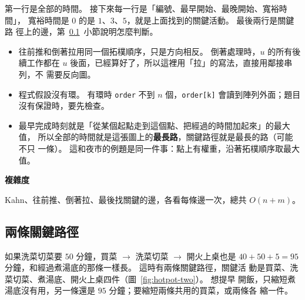 
第一行是全部的時間。 接下來每一行是「編號、最早開始、最晚開始、寬裕時間」，
寬裕時間是 $0$ 的是 $1$、$3$、$5$，就是上面找到的關鍵活動。 最後兩行是關鍵路
徑上的邊，第~\ref{sec:cp-all}~小節說明怎麼判斷。

\begin{itemize}
\item 往前推和倒著拉用同一個拓樸順序，只是方向相反。 倒著處理時，$u$ 的所有後
續工作都在 $u$ 後面，已經算好了，所以這裡用「拉」的寫法，直接用鄰接串列，不
需要反向圖。
\item 程式假設沒有環。 有環時 \texttt{order} 不到 $n$ 個，\texttt{order[k]}
會讀到陣列外面；題目沒有保證時，要先檢查。
\item 最早完成時刻就是「從某個起點走到這個點、把經過的時間加起來」的最大值，
所以全部的時間就是這張圖上的\textbf{最長路}，關鍵路徑就是最長的路（可能不只
一條）。 這和夜市的例題是同一件事：點上有權重，沿著拓樸順序取最大值。
\end{itemize}

\textbf{複雜度}

Kahn、往前推、倒著拉、最後找關鍵的邊，各看每條邊一次，總共 $O(n + m)$。

\subsection{兩條關鍵路徑}
\label{sec:cp-all}

如果洗菜切菜要 $50$ 分鐘，買菜 $\to$ 洗菜切菜 $\to$ 開火上桌也是
$40 + 50 + 5 = 95$ 分鐘，和經過煮湯底的那條一樣長。 這時有兩條關鍵路徑，關鍵活
動是買菜、洗菜切菜、煮湯底、開火上桌四件（圖~\ref{fig:hotpot-two}）。 想提早
開飯，只縮短煮湯底沒有用，另一條還是 $95$ 分鐘；要縮短兩條共用的買菜，或兩條各
縮一件。

